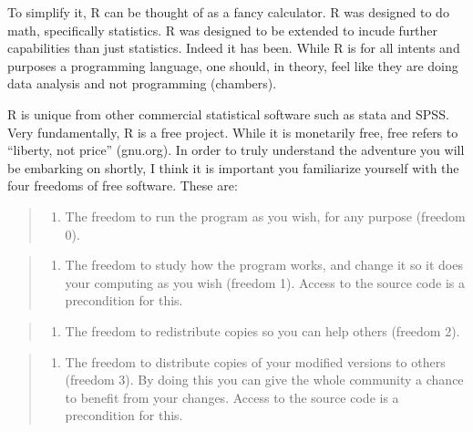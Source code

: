 \documentclass[
]{book}
\providecommand{\tightlist}{%
  \setlength{\itemsep}{0pt}\setlength{\parskip}{0pt}}
\begin{document}
To simplify it, R can be thought of as a fancy calculator. R was designed to do math, specifically statistics. R was designed to be extended to incude further capabilities than just statistics. Indeed it has been. While R is for all intents and purposes a programming language, one should, in theory, feel like they are doing data analysis and not programming (chambers).

R is unique from other commercial statistical software such as stata and SPSS. Very fundamentally, R is a free project. While it is monetarily free, free refers to ``liberty, not price'' (gnu.org). In order to truly understand the adventure you will be embarking on shortly, I think it is important you familiarize yourself with the four freedoms of free software. These are:

\begin{quote}
\begin{enumerate}
\def\labelenumi{\arabic{enumi}.}
\tightlist
\item
  The freedom to run the program as you wish, for any purpose (freedom 0).
\end{enumerate}
\end{quote}

\begin{quote}
\begin{enumerate}
\def\labelenumi{\arabic{enumi}.}
\setcounter{enumi}{1}
\tightlist
\item
  The freedom to study how the program works, and change it so it does your computing as you wish (freedom 1). Access to the source code is a precondition for this.
\end{enumerate}
\end{quote}

\begin{quote}
\begin{enumerate}
\def\labelenumi{\arabic{enumi}.}
\setcounter{enumi}{2}
\tightlist
\item
  The freedom to redistribute copies so you can help others (freedom 2).
\end{enumerate}
\end{quote}

\begin{quote}
\begin{enumerate}
\def\labelenumi{\arabic{enumi}.}
\setcounter{enumi}{3}
\tightlist
\item
  The freedom to distribute copies of your modified versions to others (freedom 3). By doing this you can give the whole community a chance to benefit from your changes. Access to the source code is a precondition for this.
\end{enumerate}
\end{quote}
\end{document}
